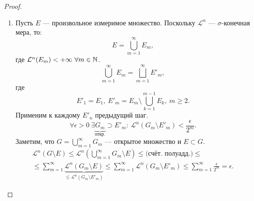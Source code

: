 \begin{proof}
\begin{enumerate}
    \item Пусть $E$ — произвольное измеримое множество.
    Поскольку $\mathcal{L}^n$ — $\sigma$-конечная мера, то:
    \[E = \bigcup\limits_{m=1}^{\infty} E_m,\]
    где $\mathcal{L}^n(E_m) < +\infty \ \forall m \in \mathbb{N}$.
    \[\bigcup\limits_{m=1}^{\infty} E_m = \bigsqcup\limits_{m=1}^{\infty} E'_m,\]
    где 
    \[E'_1 = E_1, \ E'_m = E_m \setminus \bigcup\limits_{k=1}^{m-1}E_k, \ m \geqslant 2.\]
    Применим к каждому $E'_n$ предыдущий шаг.
    \[\forall \epsilon > 0 \ \exists \underbrace{G_m}_{\text{откр.}} \supset E'_m: \ \mathcal{L}^n (G_m \setminus E'_m) < \frac{\epsilon}{2^m}.\]
    Заметим, что
    $G = \bigcup\limits_{m=1}^{\infty} G_m$ — открытое множество и $E \subset G$.
    \begin{multline*}
        \mathcal{L}^n(G \setminus E) \leqslant \mathcal{L}^n \left(\bigcup\limits_{m=1}^{\infty} G_m \setminus E\right) \leqslant \text{(счёт. полуадд.)} \leqslant \\ \leqslant
         \sum\limits_{m=1}^{\infty} \underbrace{\mathcal{L}^n(G_m \setminus E)}_{\leqslant \mathcal{L}^n (G_m \setminus E'_m)} 
        \leqslant
        \sum\limits_{m=1}^{\infty} \mathcal{L}^n (G_m \setminus E'_m) \leqslant \sum\limits_{m=1}^{\infty} \frac{\epsilon}{2^m} = \epsilon.
    \end{multline*} 
\end{enumerate}  
\end{proof} 

